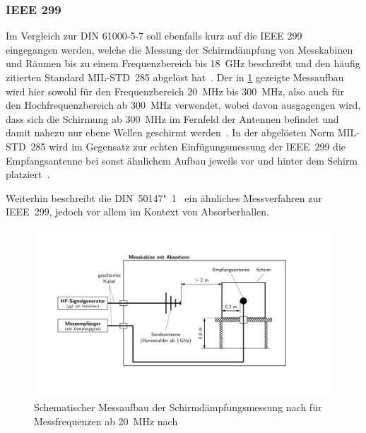 \subsubsection{IEEE 299}
Im Vergleich zur DIN 61000-5-7 soll ebenfalls kurz auf die IEEE 299~\cite{IEEE_299} eingegangen werden, welche die Messung der Schirmdämpfung von Messkabinen und Räumen bis zu einem Frequenzbereich bis \SI{18}{\giga\hertz} beschreibt und den häufig zitierten Standard MIL-STD~285 abgelöst hat~\cite{EM_Schirmung}. Der in \Abb\ref{fig:2_Schematik-Schirmdaempfungsmessung_IEEE_299} gezeigte Messaufbau wird hier sowohl für den Frequenzbereich \SI{20}{\mega\hertz} bis \SI{300}{\mega\hertz}, also auch für den Hochfrequenzbereich ab \SI{300}{\mega\hertz} verwendet, wobei davon ausgagengen wird, dass sich die Schirmung ab \SI{300}{\mega\hertz} im Fernfeld der Antennen befindet und damit nahezu nur ebene Wellen geschirmt werden~\cite{EM_Schirmung, IEEE_299}. In der abgelösten Norm MIL-STD~285 wird im Gegensatz zur echten Einfügungsmessung der IEEE~299 die Empfangsantenne bei sonst ähnlichem Aufbau jeweils vor und hinter dem Schirm platziert~\cite{EM_Schirmung}.
\par
\vspace{\linespace}
Weiterhin beschreibt die DIN~50147"~1~\cite{DIN_EN_50147-1} ein ähnliches Messverfahren zur IEEE~299, jedoch vor allem im Kontext von Absorberhallen.  

\begin{figure}[ht]
    \centering
    \includegraphics[page = 2, trim = 2cm 3cm 4cm 3cm, clip, width=.9\textwidth]{Abbildungen/Kapitel2/Schematiken_Schirmdaempfungsmessung.pdf}
    \caption[Schematischer Messaufbau der Schirmdämpfungsmessung nach \citeauthor{IEEE_299} für Messfrequenzen ab \SI{20}{\mega\hertz}]{Schematischer Messaufbau der Schirmdämpfungsmessung nach \citeauthor{IEEE_299} für Messfrequenzen ab \SI{20}{\mega\hertz} nach~\cite{IEEE_299}}
    \label{fig:2_Schematik-Schirmdaempfungsmessung_IEEE_299}
\end{figure}



